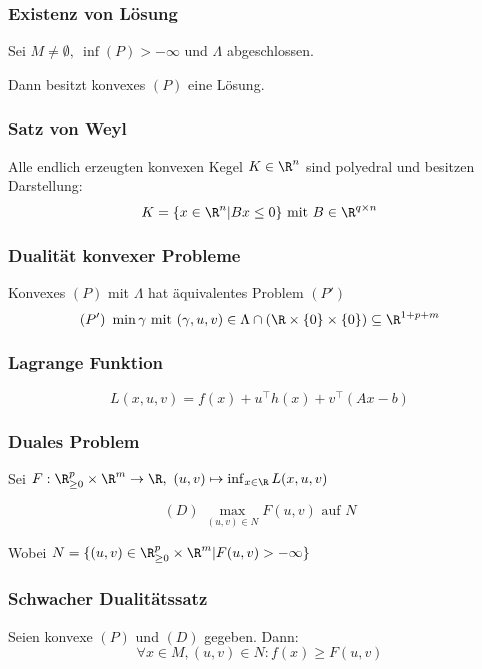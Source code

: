 \subsubsection*{Existenz von Lösung}

Sei \(M \neq \emptyset, \ \inf(P) > -\infty\) und \(\Lambda\) abgeschlossen.

Dann besitzt konvexes \((P)\) eine Lösung.

\subsubsection*{Satz von Weyl}

Alle endlich erzeugten konvexen Kegel \(K \in \R^n\) sind polyedral und besitzen Darstellung: \[K = \{x \in \R^n | Bx \leq 0\} \text{ mit } B \in \R^{q \times n}\]

\subsubsection*{Dualität konvexer Probleme}

Konvexes \((P)\) mit \(\Lambda\) hat äquivalentes Problem \((P')\)
\[(P') \ \min \gamma \text{ mit } (\gamma,u,v) \in \Lambda \cap (\R \times \{0\} \times \{0\}) \subseteq \R^{1+p+m}\]

\subsubsection*{Lagrange Funktion}

\[L(x,u,v) = f(x) + u^\top h(x) + v^\top (Ax-b)\]

\subsubsection*{Duales Problem}

Sei \(F : \R_{\geq 0}^p \times \R^m \to \R, \ (u,v) \mapsto \inf_{x \in \R} L(x,u,v)\)

\[(D) \ \max_{(u,v) \in N} F(u,v) \text{ auf } N\]

Wobei \(N =\{(u,v) \in \R_{\geq 0}^p \times \R^m | F(u,v) > -\infty\}\)

\subsubsection*{Schwacher Dualitätssatz}

Seien konvexe \((P)\) und \((D)\) gegeben. Dann:
\[\forall x \in M, (u,v) \in N : f(x) \geq F(u,v)\]

